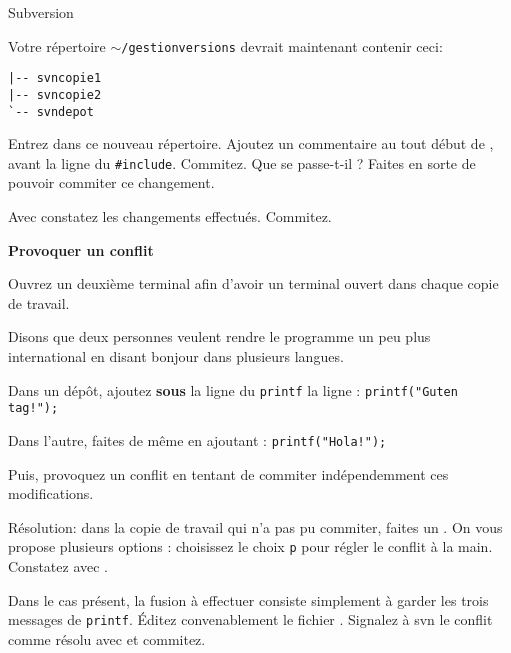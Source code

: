 \documentclass[10pt]{article}\usepackage[nu]{esial}
\begin{document}
\begin{part}{Subversion}
\begin{Exercice}
Votre répertoire {\tt $\sim$/gestionversions} devrait maintenant contenir ceci:
\begin{verbatim}
|-- svncopie1
|-- svncopie2
`-- svndepot
\end{verbatim}

Entrez dans ce nouveau répertoire. Ajoutez un commentaire au tout début de ,
avant la ligne du {\tt \#include}.
Commitez. Que se passe-t-il ? Faites en sorte de pouvoir commiter ce changement.

Avec  constatez les changements effectués. Commitez.
\end{Exercice}



\begin{Exercice} \textbf{Provoquer un conflit}

Ouvrez un deuxième terminal afin d'avoir un terminal
ouvert dans chaque copie de travail.

Disons que deux personnes veulent rendre le programme 
un peu plus international en disant bonjour dans plusieurs langues.

Dans un dépôt, ajoutez {\bf sous} la ligne du {\tt printf} la ligne :\hfill
{\tt printf("Guten tag!");}

Dans l'autre, faites de même en ajoutant : \hfill {\tt printf("Hola!");}

Puis, provoquez un conflit en tentant de commiter indépendemment ces modifications. 

Résolution: dans la copie de travail qui n'a pas pu commiter, faites un .
On vous propose plusieurs options : choisissez le choix {\tt p} pour régler le conflit
à la main. Constatez avec .

Dans le cas présent, la fusion à effectuer consiste simplement à garder les trois messages
de {\tt printf}. Éditez convenablement le fichier . Signalez à svn le conflit
comme résolu avec  et commitez.
\end{Exercice}

\end{part}
\end{document}
